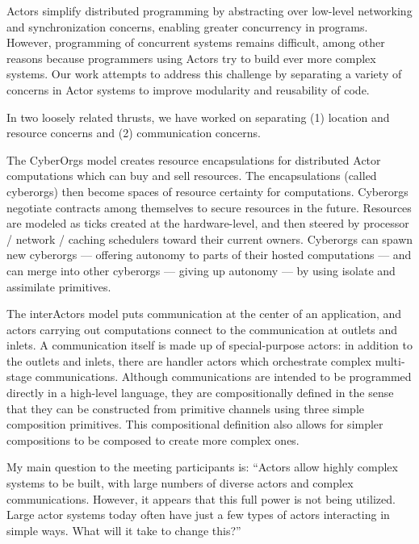 Actors simplify distributed programming by abstracting over low-level networking and synchronization concerns, enabling greater concurrency in programs.  However, programming of concurrent systems remains difficult, among other reasons because programmers using Actors try to build ever more complex systems.  Our work attempts to address this challenge by separating a variety of concerns in Actor systems to improve modularity and reusability of code.

In two loosely related thrusts, we have worked on separating (1) location and resource concerns and (2) communication concerns.

The CyberOrgs model creates resource encapsulations for distributed Actor computations which can buy and sell resources.  The encapsulations (called cyberorgs) then become spaces of resource certainty for computations.  Cyberorgs negotiate contracts among themselves to secure resources in the future.  Resources are modeled as ticks created at the hardware-level, and then steered by processor / network / caching schedulers toward their current owners.  Cyberorgs can spawn new cyberorgs — offering autonomy to parts of their hosted computations — and can merge into other cyberorgs — giving up autonomy —  by using isolate and assimilate primitives.  

The interActors model puts communication at the center of an application, and actors carrying out computations connect to the communication at outlets and inlets.  A communication itself is made up of special-purpose actors: in addition to the outlets and inlets, there are handler actors which orchestrate complex multi-stage communications.  Although communications are intended to be programmed directly in a high-level language, they are compositionally defined in the sense that they can be constructed from primitive channels using three simple composition primitives.  This compositional definition also allows for simpler compositions to be composed to create more complex ones.

My main question to the meeting participants is: “Actors allow highly complex systems to be built, with large numbers of diverse actors and complex communications.  However, it appears that this full power is not being utilized.  Large actor systems today often have just a few types of actors interacting in simple ways.  What will it take to change this?”  

